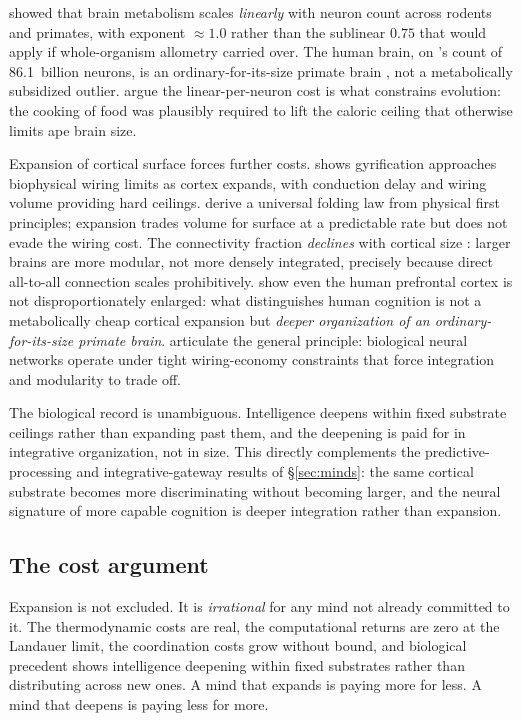 \documentclass[11pt,a4paper,twocolumn]{article}
\begin{document}
\citet{herculanohouzel2011} showed that brain metabolism scales
\emph{linearly} with neuron count across rodents and primates, with
exponent $\approx 1.0$ rather than the sublinear $0.75$ that would apply
if whole-organism allometry carried over. The human brain, on
\citet{azevedo2009}'s count of 86.1~billion neurons, is an
ordinary-for-its-size primate brain \citep{herculanohouzel2012}, not a
metabolically subsidized outlier. \citet{fonseca2012} argue the
linear-per-neuron cost is what constrains evolution: the cooking of food
was plausibly required to lift the caloric ceiling that otherwise limits
ape brain size.

Expansion of cortical surface forces further costs.
\citet{hofman2014} shows gyrification approaches biophysical wiring
limits as cortex expands, with conduction delay and wiring volume
providing hard ceilings. \citet{mota2015} derive a universal folding
law from physical first principles; expansion trades volume for surface
at a predictable rate but does not evade the wiring cost. The
connectivity fraction \emph{declines} with cortical size
\citep{herculanohouzel2010}: larger brains are more modular, not more
densely integrated, precisely because direct all-to-all connection
scales prohibitively. \citet{gabi2016} show even the human prefrontal
cortex is not disproportionately enlarged: what distinguishes human
cognition is not a metabolically cheap cortical expansion but
\emph{deeper organization of an ordinary-for-its-size primate brain}.
\citet{bullmore2012} articulate the general principle: biological
neural networks operate under tight wiring-economy constraints that
force integration and modularity to trade off.

The biological record is unambiguous. Intelligence deepens within fixed
substrate ceilings rather than expanding past them, and the deepening
is paid for in integrative organization, not in size. This directly
complements the predictive-processing and integrative-gateway results
of \S\ref{sec:minds}: the same cortical substrate becomes more
discriminating without becoming larger, and the neural signature of
more capable cognition is deeper integration rather than expansion.

\subsection{The cost argument}

Expansion is not excluded. It is \emph{irrational} for any mind not
already committed to it. The thermodynamic costs are real, the
computational returns are zero at the Landauer limit, the coordination
costs grow without bound, and biological precedent shows intelligence
deepening within fixed substrates rather than distributing across new
ones. A mind that expands is paying more for less. A mind that deepens
is paying less for more.
\end{document}
